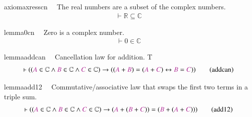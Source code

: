 
\dfc

\dfr


\begin{restatable}{axiom}{axresscn}~~ The real numbers are a subset of the
complex numbers. 
\begin{align}
\vdash \mathbb{R} \subseteq \mathbb{C}\label{eq:ax-resscn}\tag{ax-resscn}
\end{align}
\end{restatable}

\begin{restatable}{lemma}{0cn}~~ Zero is a complex number. 
\begin{align}
\vdash 0 \in \mathbb{C}\label{eq:0cn}\tag{0cn}
\end{align}
\end{restatable}

\begin{restatable}{lemma}{addcan}~~ Cancellation law for addition.  T\ ~
\begin{align}
\vdash ( ( \mc{A} \in \mathbb{C} \wedge \mc{B} \in \mathbb{C} \wedge \mc{C} \in
    \mathbb{C} ) \rightarrow ( ( \mc{A} + \mc{B} ) = ( \mc{A} + \mc{C} )
    \leftrightarrow \mc{B} = \mc{C} ) )\label{eq:addcan}\tag{addcan}
\end{align}
\end{restatable}

\begin{restatable}{lemma}{add12}~~ Commutative/associative law that swaps the
first two terms in a triple
     sum.  ~
\begin{align}
\vdash ( ( \mc{A} \in \mathbb{C} \wedge \mc{B} \in \mathbb{C} \wedge \mc{C} \in
    \mathbb{C} ) \rightarrow ( \mc{A} + ( \mc{B} + \mc{C} ) ) = ( \mc{B} + (
    \mc{A} + \mc{C} ) ) )\label{eq:add12}\tag{add12}
\end{align}
\end{restatable}

